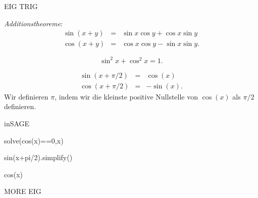 \documentclass[fontsize=12pt,paper=a4,twoside,bibtotoc,idxtotoc,
liststotoc,pagesize,BCOR1.2cm,DIV15,chapterprefix,pagesize=pdftex]{scrbook}
\theoremstyle{plain}
\theoremstyle{definition}
\theoremstyle{remark}
\begin{document}
EIG TRIG


 \emph{Additionstheoreme}:
\begin{eqnarray*}
\sin(x+y) & = &\sin x \cos y+ \cos x \sin y \\
\cos(x+y) & = &\cos x \cos y - \sin x \sin y .
\end{eqnarray*} 
 
\[\sin^2x +\cos^2x=1.\]
 
\begin{eqnarray*}
\sin(x+\pi/2)&=&\cos(x)\\
 \cos(x+\pi/2)&=&-\sin(x).
\end{eqnarray*} 
 Wir definieren $\pi$, indem wir die kleinste positive Nullstelle
von $\cos(x)$ als $\pi/2$ definieren.



inSAGE

\begin{sagein}
solve(cos(x)==0,x)
\end{sagein}
\begin{sage}
[x == 1/2*pi]
\end{sage}
\begin{sagein}
sin(x+pi/2).simplify()
\end{sagein}
\begin{sage}
cos(x)
\end{sage}

MORE EIG
\end{document}
